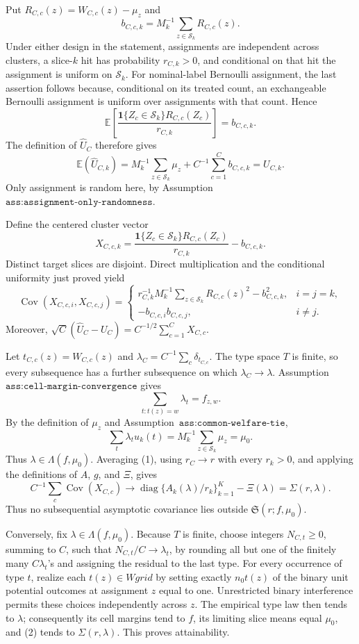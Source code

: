 Put \(R_{C,c}(z)=W_{C,c}(z)-\mu_z\) and
\[
b_{C,c,k}=M_k^{-1}\sum_{z\in\mathcal S_k}R_{C,c}(z).
\]
Under either design in the statement, assignments are independent across clusters, a slice-\(k\) hit has probability \(r_{C,k}>0\), and conditional on that hit the assignment is uniform on \(\mathcal S_k\). For nominal-label Bernoulli assignment, the last assertion follows because, conditional on its treated count, an exchangeable Bernoulli assignment is uniform over assignments with that count. Hence
\[
\mathbb E\left[\frac{\mathbf 1\{Z_c\in\mathcal S_k\}R_{C,c}(Z_c)}{r_{C,k}}\right]=b_{C,c,k}.
\]
The definition of \(\widehat U_C\) therefore gives
\[
\mathbb E(\widehat U_{C,k})=M_k^{-1}\sum_{z\in\mathcal S_k}\mu_z+C^{-1}\sum_{c=1}^Cb_{C,c,k}=U_{C,k}.
\]
Only assignment is random here, by Assumption~\(\texttt{ass:assignment-only-randomness}\).

Define the centered cluster vector
\[
X_{C,c,k}=\frac{\mathbf 1\{Z_c\in\mathcal S_k\}R_{C,c}(Z_c)}{r_{C,k}}-b_{C,c,k}.
\]
Distinct target slices are disjoint. Direct multiplication and the conditional uniformity just proved yield
\[
\operatorname{Cov}(X_{C,c,i},X_{C,c,j})=
\begin{cases}
r_{C,k}^{-1}M_k^{-1}\sum_{z\in\mathcal S_k}R_{C,c}(z)^2-b_{C,c,k}^2,&i=j=k,\\
-b_{C,c,i}b_{C,c,j},&i\ne j.
\end{cases}
\tag{1}
\]
Moreover, \(\sqrt C(\widehat U_C-U_C)=C^{-1/2}\sum_{c=1}^CX_{C,c}\).

Let \(t_{C,c}(z)=W_{C,c}(z)\) and \(\lambda_C=C^{-1}\sum_c\delta_{t_{C,c}}\). The type space \(T\) is finite, so every subsequence has a further subsequence on which \(\lambda_C\to\lambda\). Assumption~\(\texttt{ass:cell-margin-convergence}\) gives
\[
\sum_{t:t(z)=w}\lambda_t=f_{z,w}.
\]
By the definition of \(\mu_z\) and Assumption~\(\texttt{ass:common-welfare-tie}\),
\[
\sum_t\lambda_tu_k(t)=M_k^{-1}\sum_{z\in\mathcal S_k}\mu_z=\mu_0.
\]
Thus \(\lambda\in\Lambda(f,\mu_0)\). Averaging (1), using \(r_C\to r\) with every \(r_k>0\), and applying the definitions of \(A\), \(g\), and \(\Xi\), gives
\[
C^{-1}\sum_c\operatorname{Cov}(X_{C,c})\longrightarrow
\operatorname{diag}\{A_k(\lambda)/r_k\}_{k=1}^K-\Xi(\lambda)=\Sigma(r,\lambda).
\tag{2}
\]
Thus no subsequential asymptotic covariance lies outside \(\mathfrak S(r;f,\mu_0)\).

Conversely, fix \(\lambda\in\Lambda(f,\mu_0)\). Because \(T\) is finite, choose integers \(N_{C,t}\ge0\), summing to \(C\), such that \(N_{C,t}/C\to\lambda_t\), by rounding all but one of the finitely many \(C\lambda_t\)'s and assigning the residual to the last type. For every occurrence of type \(t\), realize each \(t(z)\in Wgrid\) by setting exactly \(n_0t(z)\) of the binary unit potential outcomes at assignment \(z\) equal to one. Unrestricted binary interference permits these choices independently across \(z\). The empirical type law then tends to \(\lambda\); consequently its cell margins tend to \(f\), its limiting slice means equal \(\mu_0\), and (2) tends to \(\Sigma(r,\lambda)\). This proves attainability.

